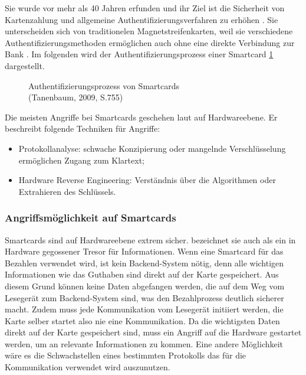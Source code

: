 Sie wurde vor mehr als 40 Jahren erfunden und ihr Ziel ist die Sicherheit von Kartenzahlung und allgemeine
Authentifizierungsverfahren zu erhöhen \cite{refip:JFSB}. Sie unterscheiden sich von traditionelen 
Magnetstreifenkarten, weil sie verschiedene Authentifizierungsmethoden ermöglichen auch ohne eine direkte 
Verbindung zur Bank \cite{refbook:ATMS}. Im folgenden wird der Authentifizierungsprozess einer Smartcard 
\ref{fig:refbook_ATMS} dargestellt. 

\vfill
\begin{figure}[H]
   \caption{Authentifizierungsprozess von Smartcards\\(Tanenbaum, 2009, S.755)}
   \label{fig:refbook_ATMS}
\end{figure}
\vfill

Die meisten Angriffe bei Smartcards geschehen laut \cite{refmas:ASSS} auf Hardwareebene.
Er beschreibt folgende Techniken für Angriffe:

\begin{itemize}
    \item Protokollanalyse: schwache Konzipierung oder mangelnde Verschlüsselung ermöglichen Zugang 
    zum Klartext; 
    \item Hardware Reverse Engineering: Verständnis über die Algorithmen oder Extrahieren des Schlüssels.
\end{itemize}


\subsubsection{Angriffsmöglichkeit auf Smartcards}
Smartcards sind auf Hardwareebene extrem sicher. \cite{refmas:ASSS} bezeichnet sie auch als ein in Hardware gegossener
Tresor für Informationen. Wenn eine Smartcard für das Bezahlen verwendet wird, ist kein Backend-System nötig,
denn alle wichtigen Informationen wie das Guthaben sind direkt auf der Karte gespeichert. Aus diesem Grund können
keine Daten abgefangen werden, die auf dem Weg vom Lesegerät zum Backend-System sind, was den Bezahlprozess
deutlich sicherer macht. Zudem muss jede Kommunikation vom Lesegerät initiiert werden, die Karte selber startet
also nie eine Kommunikation. Da die wichtigsten Daten direkt auf der Karte gespeichert sind, muss ein Angriff
auf die Hardware gestartet werden, um an relevante Informationen zu kommen. Eine andere Möglichkeit wäre es 
die Schwachstellen eines bestimmten Protokolls das für die Kommunikation verwendet wird auszunutzen.

